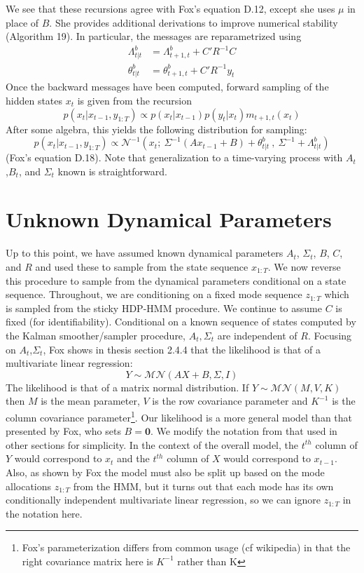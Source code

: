 \documentclass[12pt]{article}
\begin{document}
We see that these recursions agree with Fox's equation D.12, except she uses $\mu$ in place of $B$. She provides additional derivations to improve numerical stability (Algorithm 19). In particular, the messages are reparametrized using
\begin{align*}
\Lambda^b_{t|t} &= \Lambda^b_{t+1,t} + C'R^{-1}C\\
\theta^b_{t|t} &= \theta^b_{t+1,t} + C'R^{-1}y_t
\end{align*}
Once the backward messages have been computed, forward sampling of the hidden states $x_t$ is given from the recursion
\[p(x_t|x_{t-1},y_{1:T}) \propto p(x_t|x_{t-1})p(y_t|x_t)m_{t+1,t}(x_t)\]
After some algebra, this yields the following distribution for sampling:
\[p(x_t|x_{t-1},y_{1:T}) \propto \mathcal{N}^{-1}(x_t;~\Sigma^{-1}(Ax_{t-1}+B)+\theta^b_{t|t}~,~\Sigma^{-1}+\Lambda^b_{t|t})\]
(Fox's equation D.18). Note that generalization to a time-varying process with $A_t$,$B_t$, and $\Sigma_t$ known is straightforward.

\section{Unknown Dynamical Parameters}

Up to this point, we have assumed known dynamical parameters $A_t$, $\Sigma_t$, $B$, $C$, and $R$ and used these to sample from the state sequence $x_{1:T}$. We now reverse this procedure to sample from the dynamical parameters conditional on a state sequence. Throughout, we are conditioning on a fixed mode sequence $z_{1:T}$ which is sampled from the sticky HDP-HMM procedure. We continue to assume $C$ is fixed (for identifiability). Conditional on a known sequence of states computed by the Kalman smoother/sampler procedure, $A_t,\Sigma_t$ are independent of $R$. Focusing on $A_t$,$\Sigma_t$, Fox shows in thesis section 2.4.4 that the likelihood is that of a multivariate linear regression:
\[Y\sim\mathcal{MN}(AX+B,\Sigma,I)\]
The likelihood is that of a matrix normal distribution. If $Y\sim\mathcal{MN}(M,V,K)$ then $M$ is the mean parameter, $V$ is the row covariance parameter and $K^{-1}$ is the column covariance parameter\footnote{Fox's parameterization differs from common usage (cf wikipedia) in that the right covariance matrix here is $K^{-1}$ rather than K}. Our likelihood is a more general model than that presented by Fox, who sets $B=\mathbf{0}$. We modify the notation from that used in other sections for simplicity. In the context of the overall model, the $t^{th}$ column of $Y$ would correspond to $x_{t}$ and the $t^{th}$ column of $X$ would correspond to $x_{t-1}$. Also, as shown by Fox the model must also be split up based on the mode allocations $z_{1:T}$ from the HMM, but it turns out that each mode has its own conditionally independent multivariate linear regression, so we can ignore $z_{1:T}$ in the notation here.
\end{document}
